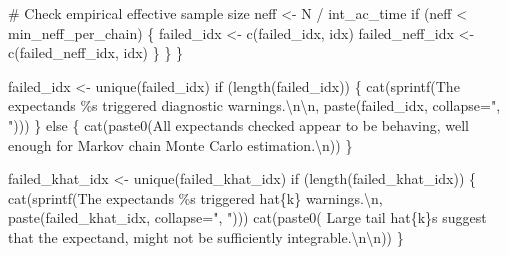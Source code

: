 \documentclass[
  letterpaper,
  DIV=11,
  numbers=noendperiod]{scrartcl}
\newenvironment{Shaded}{\begin{snugshade}}{\end{snugshade}}
\newcommand{\AttributeTok}[1]{\textcolor[rgb]{0.40,0.45,0.13}{#1}}
\newcommand{\CommentTok}[1]{\textcolor[rgb]{0.37,0.37,0.37}{#1}}
\newcommand{\ControlFlowTok}[1]{\textcolor[rgb]{0.00,0.23,0.31}{#1}}
\newcommand{\FunctionTok}[1]{\textcolor[rgb]{0.28,0.35,0.67}{#1}}
\newcommand{\NormalTok}[1]{\textcolor[rgb]{0.00,0.23,0.31}{#1}}
\newcommand{\OtherTok}[1]{\textcolor[rgb]{0.00,0.23,0.31}{#1}}
\newcommand{\SpecialCharTok}[1]{\textcolor[rgb]{0.37,0.37,0.37}{#1}}
\newcommand{\StringTok}[1]{\textcolor[rgb]{0.13,0.47,0.30}{#1}}
\begin{document}
\begin{Shaded}
\begin{Highlighting}[]
      \CommentTok{\# Check empirical effective sample size}
\NormalTok{      neff }\OtherTok{\textless{}{-}}\NormalTok{ N }\SpecialCharTok{/}\NormalTok{ int\_ac\_time}
      \ControlFlowTok{if}\NormalTok{ (neff }\SpecialCharTok{\textless{}}\NormalTok{ min\_neff\_per\_chain) \{}
\NormalTok{        failed\_idx }\OtherTok{\textless{}{-}} \FunctionTok{c}\NormalTok{(failed\_idx, idx)}
\NormalTok{        failed\_neff\_idx }\OtherTok{\textless{}{-}} \FunctionTok{c}\NormalTok{(failed\_neff\_idx, idx)}
\NormalTok{      \}}
\NormalTok{    \}}
\NormalTok{  \}}
  
\NormalTok{  failed\_idx }\OtherTok{\textless{}{-}} \FunctionTok{unique}\NormalTok{(failed\_idx)}
  \ControlFlowTok{if}\NormalTok{ (}\FunctionTok{length}\NormalTok{(failed\_idx)) \{}
    \FunctionTok{cat}\NormalTok{(}\FunctionTok{sprintf}\NormalTok{(}\StringTok{\textquotesingle{}The expectands \%s triggered diagnostic warnings.}\SpecialCharTok{\textbackslash{}n\textbackslash{}n}\StringTok{\textquotesingle{}}\NormalTok{,}
                \FunctionTok{paste}\NormalTok{(failed\_idx, }\AttributeTok{collapse=}\StringTok{", "}\NormalTok{)))}
\NormalTok{  \} }\ControlFlowTok{else}\NormalTok{ \{}
    \FunctionTok{cat}\NormalTok{(}\FunctionTok{paste0}\NormalTok{(}\StringTok{\textquotesingle{}All expectands checked appear to be behaving\textquotesingle{}}\NormalTok{,}
               \StringTok{\textquotesingle{}well enough for Markov chain Monte Carlo estimation.}\SpecialCharTok{\textbackslash{}n}\StringTok{\textquotesingle{}}\NormalTok{))}
\NormalTok{  \}}

\NormalTok{  failed\_khat\_idx }\OtherTok{\textless{}{-}} \FunctionTok{unique}\NormalTok{(failed\_khat\_idx)}
  \ControlFlowTok{if}\NormalTok{ (}\FunctionTok{length}\NormalTok{(failed\_khat\_idx)) \{}
    \FunctionTok{cat}\NormalTok{(}\FunctionTok{sprintf}\NormalTok{(}\StringTok{\textquotesingle{}The expectands \%s triggered hat\{k\} warnings.}\SpecialCharTok{\textbackslash{}n}\StringTok{\textquotesingle{}}\NormalTok{,}
                \FunctionTok{paste}\NormalTok{(failed\_khat\_idx, }\AttributeTok{collapse=}\StringTok{", "}\NormalTok{)))}
    \FunctionTok{cat}\NormalTok{(}\FunctionTok{paste0}\NormalTok{(}\StringTok{\textquotesingle{}  Large tail hat\{k\}s suggest that the expectand\textquotesingle{}}\NormalTok{,}
               \StringTok{\textquotesingle{} might not be sufficiently integrable.}\SpecialCharTok{\textbackslash{}n\textbackslash{}n}\StringTok{\textquotesingle{}}\NormalTok{))}
\NormalTok{  \}}
        

\end{Highlighting}
\end{Shaded}
\end{document}

